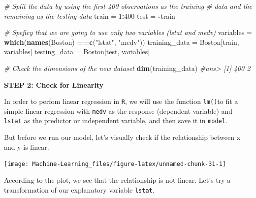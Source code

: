 \documentclass[]{book}
\newenvironment{Shaded}{\begin{snugshade}}{\end{snugshade}}
\newcommand{\KeywordTok}[1]{\textcolor[rgb]{0.13,0.29,0.53}{\textbf{#1}}}
\newcommand{\DecValTok}[1]{\textcolor[rgb]{0.00,0.00,0.81}{#1}}
\newcommand{\StringTok}[1]{\textcolor[rgb]{0.31,0.60,0.02}{#1}}
\newcommand{\CommentTok}[1]{\textcolor[rgb]{0.56,0.35,0.01}{\textit{#1}}}
\newcommand{\OperatorTok}[1]{\textcolor[rgb]{0.81,0.36,0.00}{\textbf{#1}}}
\newcommand{\NormalTok}[1]{#1}
\begin{document}
\begin{Shaded}
\begin{Highlighting}[]
\CommentTok{# Split the data by using the first 400 observations as the training}
\CommentTok{# data and the remaining as the testing data}
\NormalTok{train =}\StringTok{ }\DecValTok{1}\OperatorTok{:}\DecValTok{400}
\NormalTok{test =}\StringTok{ }\OperatorTok{-}\NormalTok{train}

\CommentTok{# Speficy that we are going to use only two variables (lstat and medv)}
\NormalTok{variables =}\StringTok{ }\KeywordTok{which}\NormalTok{(}\KeywordTok{names}\NormalTok{(Boston) }\OperatorTok{==}\KeywordTok{c}\NormalTok{(}\StringTok{"lstat"}\NormalTok{, }\StringTok{"medv"}\NormalTok{))}
\NormalTok{training_data =}\StringTok{ }\NormalTok{Boston[train, variables]}
\NormalTok{testing_data =}\StringTok{ }\NormalTok{Boston[test, variables]}

\CommentTok{# Check the dimensions of the new dataset}
\KeywordTok{dim}\NormalTok{(training_data)}
\CommentTok{#ans> [1] 400   2}
\end{Highlighting}
\end{Shaded}

\textbf{STEP 2: Check for Linearity}

In order to perfom linear regression in \texttt{R}, we will use the
function \texttt{lm()}to fit a simple linear regression with
\texttt{medv} as the response (dependent variable) and \texttt{lstat} as
the predictor or independent variable, and then save it in
\texttt{model}.

But before we run our model, let's visually check if the relationship
between x and y is linear.

\begin{Shaded}
\end{Shaded}

\begin{center}\texttt{[image: Machine-Learning\_files/figure-latex/unnamed-chunk-31-1]} \end{center}

According to the plot, we see that the relationship is not linear. Let's
try a transformation of our explanatory variable \texttt{lstat}.

\begin{Shaded}
\end{Shaded}
\end{document}
